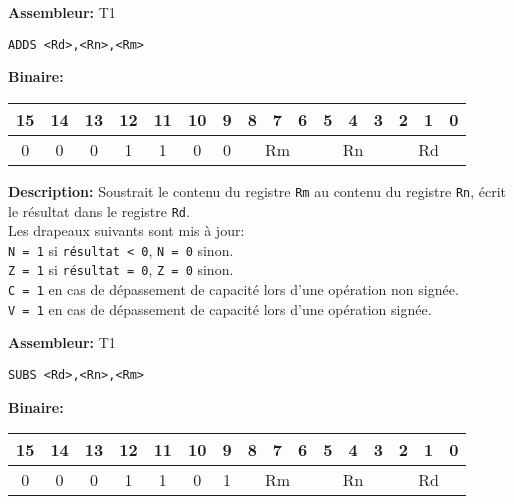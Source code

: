 \documentclass{article}
\begin{document}
    \textbf{Assembleur:} T1

    \begin{lstlisting}
ADDS <Rd>,<Rn>,<Rm>
    \end{lstlisting}

    \textbf{Binaire:}

    \begin{tabular}{| c c c c c c c c c c c c c c c c |}
        \hline
        15 & 14 & 13 & \multicolumn{1}{|c}{12} & 11 & \multicolumn{1}{|c}{10} & \multicolumn{1}{|c}{9} & \multicolumn{1}{|c}{8} & 7 & 6 & \multicolumn{1}{|c}{5} & 4 & 3 & \multicolumn{1}{|c}{2} & 1 & 0 \\
        \hline
        0 & 0 & 0 & \multicolumn{1}{|c}{1} & 1 & \multicolumn{1}{|c}{0} & \multicolumn{1}{|c}{0} & \multicolumn{3}{|c|}{Rm} & \multicolumn{3}{|c|}{Rn} & \multicolumn{3}{|c|}{Rd} \\
        \hline
    \end{tabular}



    \textbf{Description: }
    Soustrait le contenu du registre \texttt{Rm} au contenu du registre \texttt{Rn}, écrit le résultat dans le registre \texttt{Rd}.\\
    Les drapeaux suivants sont mis à jour:\\
    \texttt{N = 1} si \texttt{résultat < 0}, \texttt{N = 0} sinon.\\
    \texttt{Z = 1} si \texttt{résultat = 0}, \texttt{Z = 0} sinon.\\
    \texttt{C = 1} en cas de dépassement de capacité lors d'une opération non signée.\\
    \texttt{V = 1} en cas de dépassement de capacité lors d'une opération signée.

    \textbf{Assembleur:} T1

    \begin{lstlisting}
SUBS <Rd>,<Rn>,<Rm>
    \end{lstlisting}

    \textbf{Binaire:}

    \begin{tabular}{| c c c c c c c c c c c c c c c c |}
        \hline
        15 & 14 & 13 & \multicolumn{1}{|c}{12} & 11 & \multicolumn{1}{|c}{10} & \multicolumn{1}{|c}{9} & \multicolumn{1}{|c}{8} & 7 & 6 & \multicolumn{1}{|c}{5} & 4 & 3 & \multicolumn{1}{|c}{2} & 1 & 0 \\
        \hline
        0 & 0 & 0 & \multicolumn{1}{|c}{1} & 1 & \multicolumn{1}{|c}{0} & \multicolumn{1}{|c}{1} & \multicolumn{3}{|c|}{Rm} & \multicolumn{3}{|c|}{Rn} & \multicolumn{3}{|c|}{Rd} \\
        \hline
    \end{tabular}
\end{document}
